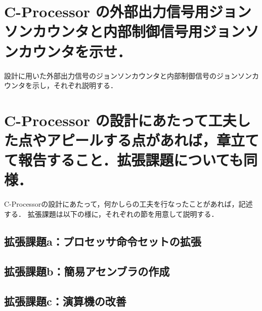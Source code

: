 \documentclass[dvipdfmx]{jarticle}
\begin{document}
\section{C-Processor の外部出力信号用ジョンソンカウンタと内部制御信号用ジョンソンカウンタを示せ．}
設計に用いた外部出力信号のジョンソンカウンタと内部制御信号のジョンソンカウンタを示し，それぞれ説明する．
~\\
\section{C-Processor の設計にあたって工夫した点やアピールする点があれば，章立てて報告すること．拡張課題についても同様．}
C-Processorの設計にあたって，何かしらの工夫を行なったことがあれば，記述する．
拡張課題は以下の様に，それぞれの節を用意して説明する．
\subsection{拡張課題a：プロセッサ命令セットの拡張}
\subsection{拡張課題b：簡易アセンブラの作成}
\subsection{拡張課題c：演算機の改善}
\end{document}
